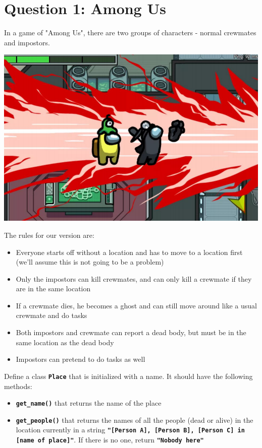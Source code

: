 \section{Question 1: Among Us}
In a game of "Among Us", there are two groups of characters - normal crewmates and
impostors. \\
\begin{center}
\includegraphics[scale=0.7]{amogus.png}
\end{center}
The rules for our version are:
\begin{itemize}
    \item Everyone starts off without a location and has to move to a location first (we'll assume
    this is not going to be a problem)
    \item Only the impostors can kill crewmates, and can only kill a crewmate if they are in the
    same location
    \item If a crewmate dies, he becomes a ghost and can still move around like a usual crewmate
    and do tasks
    \item Both impostors and crewmate can report a dead body, but must be in the same location
    as the dead body
    \item Impostors can pretend to do tasks as well
\end{itemize}

Define a class \texttt{\bfseries Place} that is initialized with a name. It should have the following methods:
\begin{itemize}
\item \texttt{\bfseries get\_name()} that returns the name of the place
\item \texttt{\bfseries get\_people()} that returns the names of all the people (dead or alive) in the
location currently in a string \texttt{\bfseries "[Person A], [Person B], [Person C] in
[name of place]"}. If there is no one, return \texttt{\bfseries "Nobody here"}
\end{itemize}

